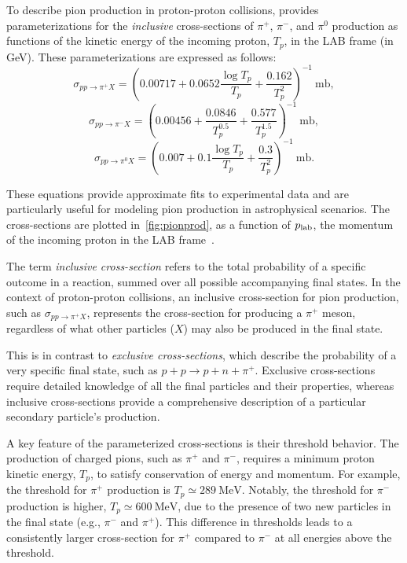 To describe pion production in proton-proton collisions, \cite{Norbury2009nimpb} provides parameterizations for the \emph{inclusive} cross-sections of \(\pi^+\), \(\pi^-\), and \(\pi^0\) production as functions of the kinetic energy of the incoming proton, \(T_p\), in the LAB frame (in GeV). These parameterizations are expressed as follows:  
\begin{equation}
\sigma_{pp \rightarrow \pi^+ X} = \left( 0.00717 + 0.0652 \frac{\log T_p}{T_p} + \frac{0.162}{T_p^2} \right)^{-1}~\text{mb}, 
\end{equation}
\begin{equation}
\sigma_{pp \rightarrow \pi^- X} = \left( 0.00456 + \frac{0.0846}{T_p^{0.5}} + \frac{0.577}{T_p^{1.5}} \right)^{-1}~\text{mb}, 
\end{equation}
\begin{equation}
\sigma_{pp \rightarrow \pi^0 X} = \left( 0.007 + 0.1 \frac{\log T_p}{T_p} + \frac{0.3}{T_p^2} \right)^{-1}~\text{mb}.
\end{equation}  

These equations provide approximate fits to experimental data and are particularly useful for modeling pion production in astrophysical scenarios. The cross-sections are plotted in~\cref{fig:pionprod}, as a function of \(p_{\rm lab}\), the momentum of the incoming proton in the LAB frame~.  

The term \emph{inclusive cross-section} refers to the total probability of a specific outcome in a reaction, summed over all possible accompanying final states. In the context of proton-proton collisions, an inclusive cross-section for pion production, such as \(\sigma_{pp \rightarrow \pi^+ X}\), represents the cross-section for producing a \(\pi^+\) meson, regardless of what other particles (\(X\)) may also be produced in the final state.  

This is in contrast to \emph{exclusive cross-sections}, which describe the probability of a very specific final state, such as \(p + p \rightarrow p + n + \pi^+\). Exclusive cross-sections require detailed knowledge of all the final particles and their properties, whereas inclusive cross-sections provide a comprehensive description of a particular secondary particle's production.  

A key feature of the parameterized cross-sections is their threshold behavior. The production of charged pions, such as \(\pi^+\) and \(\pi^-\), requires a minimum proton kinetic energy, \(T_p\), to satisfy conservation of energy and momentum. For example, the threshold for \(\pi^+\) production is \(T_p \simeq 289~\text{MeV}\). Notably, the threshold for \(\pi^-\) production is higher, \(T_p \simeq 600~\text{MeV}\), due to the presence of two new particles in the final state (e.g., \(\pi^-\) and \(\pi^+\)).  
%
This difference in thresholds leads to a consistently larger cross-section for \(\pi^+\) compared to \(\pi^-\) at all energies above the threshold.  

